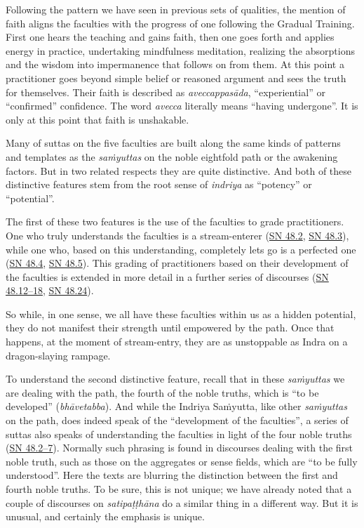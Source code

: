 \documentclass[12pt,openany]{book}%
\begin{document}
Following the pattern we have seen in previous sets of qualities, the mention of faith aligns the faculties with the progress of one following the Gradual Training. First one hears the teaching and gains faith, then one goes forth and applies energy in practice, undertaking mindfulness meditation, realizing the absorptions and the wisdom into impermanence that follows on from them. At this point a practitioner goes beyond simple belief or reasoned argument and sees the truth for themselves. Their faith is described as \textit{\textsanskrit{aveccappasāda}}, “experiential” or “confirmed” confidence. The word \textit{avecca} literally means “having undergone”. It is only at this point that faith is unshakable.

Many of suttas on the five faculties are built along the same kinds of patterns and templates as the \textit{\textsanskrit{saṁyuttas}} on the noble eightfold path or the awakening factors. But in two related respects they are quite distinctive. And both of these distinctive features stem from the root sense of \textit{indriya} as “potency” or “potential”.

The first of these two features is the use of the faculties to grade practitioners. One who truly understands the faculties is a stream-enterer (\href{https://suttacentral.net/sn48.2}{SN 48.2}, \href{https://suttacentral.net/sn48.3}{SN 48.3}), while one who, based on this understanding, completely lets go is a perfected one (\href{https://suttacentral.net/sn48.4}{SN 48.4}, \href{https://suttacentral.net/sn48.5}{SN 48.5}). This grading of practitioners based on their development of the faculties is extended in more detail in a further series of discourses (\href{https://suttacentral.net/sn48.12}{SN 48.12–18}, \href{https://suttacentral.net/sn48.24}{SN 48.24}).

So while, in one sense, we all have these faculties within us as a hidden potential, they do not manifest their strength until empowered by the path. Once that happens, at the moment of stream-entry, they are as unstoppable as Indra on a dragon-slaying rampage.

To understand the second distinctive feature, recall that in these \textit{\textsanskrit{saṁyuttas}} we are dealing with the path, the fourth of the noble truths, which is “to be developed” (\textit{\textsanskrit{bhāvetabba}}). And while the Indriya \textsanskrit{Saṁyutta}, like other \textit{\textsanskrit{saṁyuttas}} on the path, does indeed speak of the “development of the faculties”, a series of suttas also speaks of understanding the faculties in light of the four noble truths (\href{https://suttacentral.net/sn48.2}{SN 48.2–7}). Normally such phrasing is found in discourses dealing with the first noble truth, such as those on the aggregates or sense fields, which are “to be fully understood”. Here the texts are blurring the distinction between the first and fourth noble truths. To be sure, this is not unique; we have already noted that a couple of discourses on \textit{\textsanskrit{satipaṭṭhāna}} do a similar thing in a different way. But it is unusual, and certainly the emphasis is unique.
\end{document}
